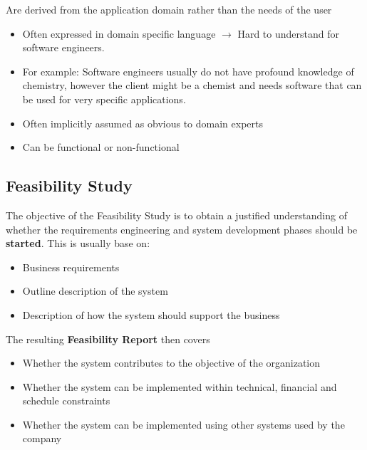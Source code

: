 \documentclass[
../../Software_Engineering_Summary.tex,
]
{subfiles}
\begin{document}
\begin{defbox*}
    Are derived from the application domain rather than the needs of the user
    \begin{itemize}
        \item Often expressed in domain specific language $\rightarrow$ Hard to understand for software engineers. 
        \item For example: Software engineers usually do not have profound knowledge of chemistry, however the client might be a chemist and needs software that can be used for very specific applications. 
        \item Often implicitly assumed as obvious to domain experts
        \item Can be functional or non-functional
    \end{itemize}
\end{defbox*}

\subsection{Feasibility Study}
The objective of the Feasibility Study is to obtain a justified understanding of whether the requirements engineering and system development phases should be \textbf{started}. This is usually base on:

\begin{defbox*}
    \begin{itemize}
        \item Business requirements 
        \item Outline description of the system
        \item Description of how the system should support the business
    \end{itemize}
\end{defbox*}

The resulting \textbf{Feasibility Report} then covers

\begin{defbox*}
    \begin{itemize}
        \item Whether the system contributes to the objective of the organization
        \item Whether the system can be implemented within technical, financial and schedule constraints
        \item Whether the system can be implemented using other systems used by the company
    \end{itemize}
\end{defbox*}
\end{document}
